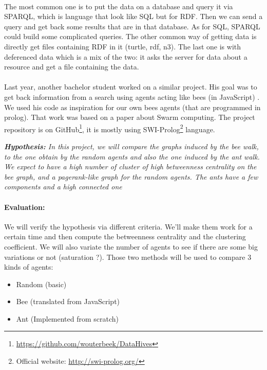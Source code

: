 \documentclass{article}
\newenvironment{itemh}[0]{\begin{itemize}[label=$\heartsuit$, font=\color{mygray} \small]}{\end{itemize}}
\begin{document}
	\paragraph{} %
	The most common one is to put the data on a database and query it via SPARQL,
	which is language that look like SQL but for RDF.
	Then we can send a query and get back some results that are in that database.
	As for SQL, SPARQL could build some complicated queries.
	The other common way of getting data is directly get files containing RDF in it (turtle, rdf, n3).
	The last one is with deferenced data which is a mix of the two:
	it asks the server for data about a resource and get a file containing the data.
	\paragraph{} %
	Last year, another bachelor student worked on a similar project.
	His goal was to get back information from a search using agents acting like bees (in JavaScript) \cite{Kroes13,Kroes13-2}.
	We used his code as inspiration for our own bees agents (that are programmed in prolog).
	That work was based on a paper \cite{Gueret10} about Swarm computing.
	The project repository is on GitHub\footnote{ \url{https://github.com/wouterbeek/DataHives}},
	it is mostly using SWI-Prolog\footnote{ Official website: \url{http://swi-prolog.org/}} language.
	\begin{center}
	\textit{
	\textbf{Hypothesis:} In this project, we will compare the graphs induced by the bee walk,
	to the one obtain by the random agents and also the one induced by the ant walk.
	We expect to have a high number of cluster of high betweenness centrality on the bee graph,
	and a pagerank-like graph for the random agents.
	The ants have a few components and a high connected one}
	\end{center}

	\paragraph{Evaluation:}
	We will verify the hypothesis via different criteria.
	We'll make them work for a certain time and then compute the betweenness centrality and the clustering coefficient.
	We will also variate the number of agents to see if there are some big variations or not (saturation ?).
	Those two methods will be used to compare 3 kinds of agents:
	\begin{itemh}
	\item Random (basic)
	\item Bee (translated from JavaScript)
	\item Ant (Implemented from scratch)
	\end{itemh}
\end{document}
